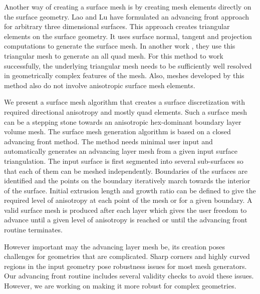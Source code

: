 \documentclass[conf]{new-aiaa}
\begin{document}
Another way of creating a surface mesh is by creating mesh elements directly on the surface geometry. Lao and Lu\cite{ lan1996finite} have formulated an advancing front approach for arbitrary three dimensional surfaces. This approach creates triangular elements on the surface geometry. It uses surface normal, tangent and projection computations to generate the surface mesh. In another work \cite{lau1997generation}, they use this triangular mesh to generate an all quad mesh. For this method to work successfully, the underlying triangular mesh needs to be sufficiently well resolved in geometrically complex features of the mesh. Also, meshes developed by this method also do not involve anisotropic surface mesh elements.


We present a surface mesh algorithm that creates a surface discretization with required directional anisotropy and mostly quad elements. Such a surface mesh can be a stepping stone towards an anisotropic hex-dominant boundary layer volume mesh. The surface mesh generation algorithm is based on a closed advancing front method. The method needs minimal user input and automatically generates an advancing layer mesh from a given input surface triangulation. The input surface is first segmented into several sub-surfaces so that each of them can be meshed independently. Boundaries of the surfaces are identified and the points on the boundary iteratively march towards the interior of the surface. Initial extrusion length and growth ratio can be defined to give the required level of anisotropy at each point of the mesh or for a given boundary. A valid surface mesh is produced after each layer which gives the user freedom to advance until a given level of anisotropy is reached or until the advancing front routine terminates.

However important may the advancing layer mesh be, its creation poses challenges for geometries that are complicated. Sharp corners and highly curved regions in the input geometry pose robustness issues for most mesh generators. Our advancing front routine includes several validity checks to avoid these issues. However, we are working on making it more robust for complex geometries.
\end{document}
